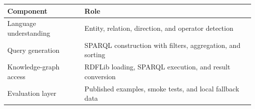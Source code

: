 \documentclass[10pt,a4paper]{article}
\begin{document}
\vspace{0.6em}
\begin{center}
\begin{tabular}{@{}ll@{}}
\toprule
\textbf{Component} & \textbf{Role} \\
\midrule
Language understanding & Entity, relation, direction, and operator detection \\
Query generation & SPARQL construction with filters, aggregation, and sorting \\
Knowledge-graph access & RDFLib loading, SPARQL execution, and result conversion \\
Evaluation layer & Published examples, smoke tests, and local fallback data \\
\bottomrule
\end{tabular}
\end{center}
\end{document}
